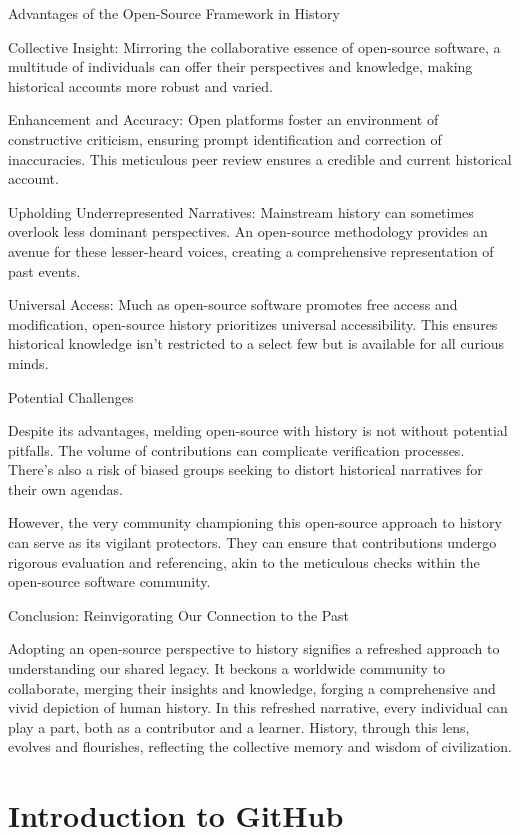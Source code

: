 \documentclass[a4paper,12pt]{book}
\begin{document}
Advantages of the Open-Source Framework in History

Collective Insight: Mirroring the collaborative essence of open-source software, a multitude of individuals can offer their perspectives and knowledge, making historical accounts more robust and varied.

Enhancement and Accuracy: Open platforms foster an environment of constructive criticism, ensuring prompt identification and correction of inaccuracies. This meticulous peer review ensures a credible and current historical account.

Upholding Underrepresented Narratives: Mainstream history can sometimes overlook less dominant perspectives. An open-source methodology provides an avenue for these lesser-heard voices, creating a comprehensive representation of past events.

Universal Access: Much as open-source software promotes free access and modification, open-source history prioritizes universal accessibility. This ensures historical knowledge isn't restricted to a select few but is available for all curious minds.

Potential Challenges

Despite its advantages, melding open-source with history is not without potential pitfalls. The volume of contributions can complicate verification processes. There's also a risk of biased groups seeking to distort historical narratives for their own agendas.

However, the very community championing this open-source approach to history can serve as its vigilant protectors. They can ensure that contributions undergo rigorous evaluation and referencing, akin to the meticulous checks within the open-source software community.

Conclusion: Reinvigorating Our Connection to the Past

Adopting an open-source perspective to history signifies a refreshed approach to understanding our shared legacy. It beckons a worldwide community to collaborate, merging their insights and knowledge, forging a comprehensive and vivid depiction of human history. In this refreshed narrative, every individual can play a part, both as a contributor and a learner. History, through this lens, evolves and flourishes, reflecting the collective memory and wisdom of civilization.

\chapter{Introduction to GitHub}
\end{document}
